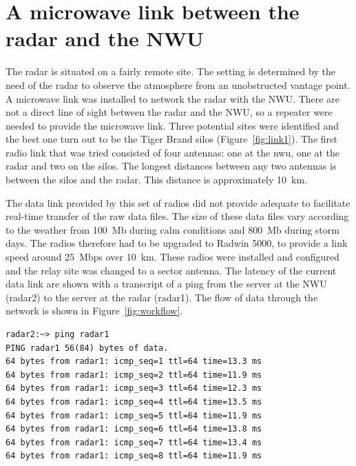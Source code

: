 \documentclass{wrcreport}
\begin{document}
\section{A microwave link between the radar and the NWU}

The radar is situated on a fairly remote site. The setting is
determined by the need of the radar to observe the atmosphere from an
unobstructed vantage point. A microwave link was installed to network
the radar with the NWU. There are not a direct line of sight between
the radar and the NWU, so a repeater were needed to provide the
microwave link. Three potential sites were identified and the best one
turn out to be the Tiger Brand silos (Figure~\ref{fig:link1}). The
first radio link that was tried consisted of four antennas: one at the
\gls{nwu}, one at the radar and two on the silos. The longest
distances between any two antennas is between the silos and the radar.
This distance is approximately \SI{10}{km}. 

The data link provided by this set of radios did not provide adequate
to facilitate real-time transfer of the raw data files. The size of
these data files vary according to the weather from \SI{100}{Mb}
during calm conditions and \SI{800}{Mb} during storm days. The radios
therefore had to be upgraded to Radwin 5000, to provide a link speed
around \SI{25}{Mbps} over \SI{10}{km}. These radios were installed and
configured and the relay site was changed to a sector antenna. The
latency of the current data link are shown with a transcript of a ping
from the server at the NWU (radar2) to the server at the radar
(radar1). The flow of data through the network is shown in
Figure~\ref{fig:workflow}.

\begin{verbatim}
radar2:~> ping radar1
PING radar1 56(84) bytes of data.
64 bytes from radar1: icmp_seq=1 ttl=64 time=13.3 ms
64 bytes from radar1: icmp_seq=2 ttl=64 time=11.9 ms
64 bytes from radar1: icmp_seq=3 ttl=64 time=12.3 ms
64 bytes from radar1: icmp_seq=4 ttl=64 time=13.5 ms
64 bytes from radar1: icmp_seq=5 ttl=64 time=11.9 ms
64 bytes from radar1: icmp_seq=6 ttl=64 time=13.8 ms
64 bytes from radar1: icmp_seq=7 ttl=64 time=13.4 ms
64 bytes from radar1: icmp_seq=8 ttl=64 time=11.9 ms
\end{verbatim}
\end{document}
